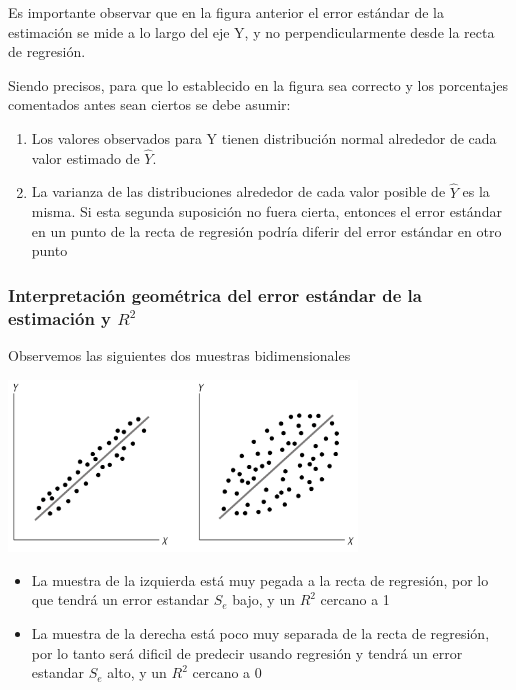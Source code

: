 \documentclass[]{book}
\providecommand{\tightlist}{%
  \setlength{\itemsep}{0pt}\setlength{\parskip}{0pt}}
\theoremstyle{plain}
\theoremstyle{definition}
\begin{document}
Es importante observar que en la figura anterior el error estándar de la
estimación se mide a lo largo del eje Y, y no perpendicularmente desde
la recta de regresión.

Siendo precisos, para que lo establecido en la figura sea correcto y los
porcentajes comentados antes sean ciertos se debe asumir:

\begin{enumerate}
\def\labelenumi{\arabic{enumi}.}
\tightlist
\item
  Los valores observados para Y tienen distribución normal alrededor de
  cada valor estimado de \(\hat Y\).
\item
  La varianza de las distribuciones alrededor de cada valor posible de
  \(\hat Y\) es la misma. Si esta segunda suposición no fuera cierta,
  entonces el error estándar en un punto de la recta de regresión podría
  diferir del error estándar en otro punto
\end{enumerate}

\subsubsection*{Interpretación geométrica del error estándar
de la estimación y
\(R^2\)}

Observemos las siguientes dos muestras bidimensionales

\includegraphics[width=3.64583in,height=\textheight]{img/error_regression.png}

\begin{itemize}
\tightlist
\item
  La muestra de la izquierda está muy pegada a la recta de regresión,
  por lo que tendrá un error estandar \(S_e\) bajo, y un \(R^2\) cercano
  a 1
\item
  La muestra de la derecha está poco muy separada de la recta de
  regresión, por lo tanto será dificil de predecir usando regresión y
  tendrá un error estandar \(S_e\) alto, y un \(R^2\) cercano a 0
\end{itemize}
\end{document}
